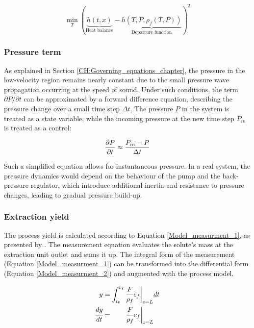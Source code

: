\documentclass[a4paper,fleqn]{cas-dc}
\begin{document}
		{\footnotesize
			\begin{equation}
				\min_T \left( \underbrace{h\left(t,x\right)}_{\text{Heat balance}} - \underbrace{h\left(T,P,\rho_f\left(T,P\right)\right)}_{\text{Departure function}} \right)^2
				\label{EQ:Enthalpy_root}
			\end{equation}
		}
		
		\subsubsection{Pressure term} \label{CH: Pressure}
		
		As explained in Section \ref{CH:Governing_equations_chapter}, the pressure in the low-velocity region remains nearly constant due to the small pressure wave propagation occurring at the speed of sound. Under such conditions, the term $\partial P/\partial t$ can be approximated by a forward difference equation, describing the pressure change over a small time step $\Delta t$. The pressure $P$ in the system is treated as a state variable, while the incoming pressure at the new time step $P_{in}$ is treated as a control:
		
		{\footnotesize
			\begin{equation}
				\frac{\partial {\color{black}P}}{\partial t} \approx \frac{{\color{black}P_{in}} - {\color{black}P} }{\Delta t}
		\end{equation}}
		
		Such a simplified equation allows for instantaneous pressure. In a real system, the pressure dynamics would depend on the behaviour of the pump and the back-pressure regulator, which introduce additional inertia and resistance to pressure changes, leading to gradual pressure build-up.
		
		\subsubsection{Extraction yield} \label{CH: Yield}
		
		The process yield is calculated according to Equation \ref{Model_measurment_1}, as presented by \citet{Sovova1994a}. The measurement equation evaluates the solute's mass at the extraction unit outlet and sums it up. The integral form of the measurement (Equation \ref{Model_measurment_1}) can be transformed into the differential form (Equation \ref{Model_measurment_2}) and augmented with the process model.
		
		{\footnotesize
			\begin{align} 
				\label{Model_measurment_1}
				y &= \int_{t_0}^{t_f} \cfrac{F}{\rho_f} c_f \biggr\rvert_{z=L} dt \\
				\cfrac{dy}{dt} &= \qquad \cfrac{F}{\rho_f} c_f \biggr\rvert_{z=L} 
				\label{Model_measurment_2}
		\end{align}	}
\end{document}
